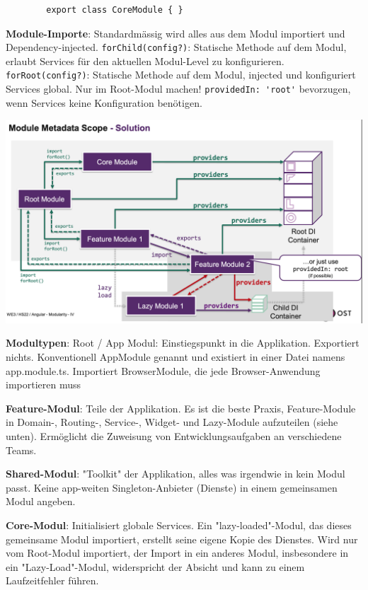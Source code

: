 \documentclass[10pt,landscape]{article}
\begin{document}
\begin{multicols}{2}
\begin{lstlisting}
        export class CoreModule { }
        \end{lstlisting}

        \textbf{Module-Importe}: Standardmässig wird alles aus dem Modul importiert und Dependency-injected.
        \lstinline{forChild(config?)}: Statische Methode auf dem Modul, erlaubt Services für den aktuellen Modul-Level zu konfigurieren.
        \lstinline{forRoot(config?)}: Statische Methode auf dem Modul, injected und konfiguriert Services global.
        Nur im Root-Modul machen!
        \lstinline{providedIn: 'root'} bevorzugen, wenn Services keine Konfiguration benötigen.

        \includegraphics[width=\linewidth]{angular_module_big_picture}

        \textbf{Modultypen}: Root / App Modul: Einstiegspunkt in die Applikation.
        Exportiert nichts.
        Konventionell AppModule genannt und existiert in einer Datei namens app.module.ts.
        Importiert BrowserModule, die jede Browser-Anwendung importieren muss

        \textbf{Feature-Modul}: Teile der Applikation.
        Es ist die beste Praxis, Feature-Module in Domain-, Routing-, Service-, Widget- und Lazy-Module aufzuteilen (siehe unten).
        Ermöglicht die Zuweisung von Entwicklungsaufgaben an verschiedene Teams.

        \textbf{Shared-Modul}: "Toolkit" der Applikation, alles was irgendwie in kein Modul passt.
        Keine app-weiten Singleton-Anbieter (Dienste) in einem gemeinsamen Modul angeben.

        \textbf{Core-Modul}: Initialisiert globale Services.
        Ein "lazy-loaded"-Modul, das dieses gemeinsame Modul importiert, erstellt seine eigene Kopie des Dienstes.
        Wird nur vom Root-Modul importiert, der Import in ein anderes Modul, insbesondere in ein "Lazy-Load"-Modul, widerspricht der Absicht und kann zu einem Laufzeitfehler führen.


\end{multicols}
\end{document}
